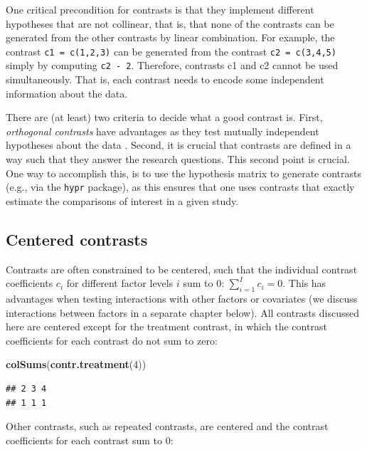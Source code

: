 \documentclass[12pt,]{krantz}
\newenvironment{Shaded}{\begin{snugshade}}{\end{snugshade}}
\newcommand{\DecValTok}[1]{\textcolor[rgb]{0.00,0.00,0.81}{#1}}
\newcommand{\KeywordTok}[1]{\textcolor[rgb]{0.13,0.29,0.53}{\textbf{#1}}}
\newcommand{\NormalTok}[1]{#1}
\begin{document}
One critical precondition for contrasts is that they implement different hypotheses that are not collinear, that is, that none of the contrasts can be generated from the other contrasts by linear combination. For example, the contrast \texttt{c1\ =\ c(1,2,3)} can be generated from the contrast \texttt{c2\ =\ c(3,4,5)} simply by computing \texttt{c2\ -\ 2}. Therefore, contrasts c1 and c2 cannot be used simultaneously. That is, each contrast needs to encode some independent information about the data.

There are (at least) two criteria to decide what a good contrast is. First, \textit{orthogonal contrasts} have advantages as they test mutually independent hypotheses about the data \citep[see][section 6.2.5, p.~91 for a detailed explanation of orthogonality]{dobson2011introduction}. Second, it is crucial that contrasts are defined in a way such that they answer the research questions. This second point is crucial. One way to accomplish this, is to use the hypothesis matrix to generate contrasts (e.g., via the \texttt{hypr} package), as this ensures that one uses contrasts that exactly estimate the comparisons of interest in a given study.

\hypertarget{centered-contrasts}{%
\subsection{Centered contrasts}\label{centered-contrasts}}

Contrasts are often constrained to be centered, such that the individual contrast coefficients \(c_i\) for different factor levels \(i\) sum to \(0\): \(\sum_{i=1}^I c_i = 0\). This has advantages when testing interactions with other factors or covariates (we discuss interactions between factors in a separate chapter below).
All contrasts discussed here are centered except for the treatment contrast, in which the contrast coefficients for each contrast do not sum to zero:

\begin{Shaded}
\begin{Highlighting}[]
\KeywordTok{colSums}\NormalTok{(}\KeywordTok{contr.treatment}\NormalTok{(}\DecValTok{4}\NormalTok{))}
\end{Highlighting}
\end{Shaded}

\begin{verbatim}
## 2 3 4 
## 1 1 1
\end{verbatim}

Other contrasts, such as repeated contrasts, are centered and the contrast coefficients for each contrast sum to \(0\):
\end{document}

